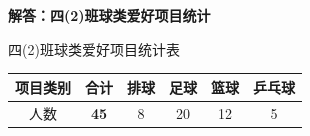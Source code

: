 



\newpage

\begin{center}
  {\large\bfseries 解答：四(2)班球类爱好项目统计}
\end{center}

\vspace{0.4cm}

\begin{center}
  {\small 四(2)班球类爱好项目统计表} \\
  \vspace{0.2cm}
  \renewcommand{\arraystretch}{1.5}
  \begin{tabular}{|c|c|c|c|c|c|}
    \hline
    项目类别 & 合计 & 排球 & 足球 & 篮球 & 乒乓球 \\
    \hline
    人数 & \textbf{\textcolor{red!70!black}{45}} & 8 & 20 & 12 & 5 \\
    \hline
  \end{tabular}
\end{center}

\vspace{0.8cm}

